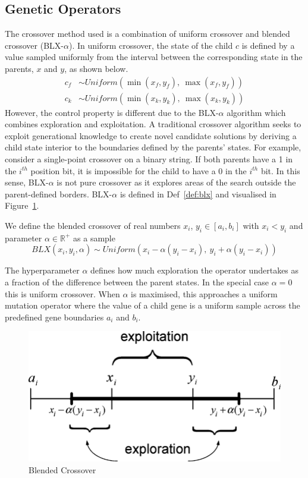 \subsection{Genetic Operators}
The crossover method used is a combination of uniform crossover and blended crossover (BLX-$\alpha$). In uniform crossover, the state of the child $c$ is defined by a value sampled uniformly from the interval between the corresponding state in the parents, $x$ and $y$, as shown below.
\begin{align}\label{eq:uniform-crossover}
  c_f &\sim \mathit{Uniform}(\min(x_f, y_f),\ \max(x_f, y_f))\\
  c_k &\sim \mathit{Uniform}(\min(x_k, y_k),\ \max(x_k, y_k))
\end{align}
However, the control property is different due to the BLX-$\alpha$ algorithm which combines exploration and exploitation. A traditional crossover algorithm seeks to exploit generational knowledge to create novel candidate solutions by deriving a child state interior to the boundaries defined by the parents' states. For example, consider a single-point crossover on a binary string. If both parents have a 1 in the $i^{th}$ position bit, it is impossible for the child to have a 0 in the $i^{th}$ bit. In this sense, BLX-$\alpha$ is not pure crossover as it explores areas of the search outside the parent-defined borders. BLX-$\alpha$ is defined in Def~\ref{def:blx} and visualised in Figure~\ref{fig:blx-alpha}.

\begin{definition}\label{def:blx}
We define the blended crossover of real numbers $x_i$, $y_i \in [a_i, b_i]$ with $x_i < y_i$ and parameter $\alpha \in \mathbb{R^+}$ as a sample\\
\begin{equation}
  BLX(x_i, y_i, \alpha) \sim \mathit{Uniform}(x_i - \alpha(y_i - x_i),\  y_i + \alpha(y_i - x_i))
\end{equation}
\end{definition}
The hyperparameter $\alpha$ defines how much exploration the operator undertakes as a fraction of the difference between the parent states. In the special case $\alpha = 0$ this is uniform crossover. When $\alpha$ is maximised, this approaches a uniform mutation operator where the value of a child gene is a uniform sample across the predefined gene boundaries $a_i$ and $b_i$.\\

\begin{figure}[!h]
\centering
    \includegraphics[width=.5\textwidth]{images/blx.png}
    \caption{Blended Crossover \cite{abido2006multiobjective}}
\label{fig:blx-alpha}
\end{figure}

